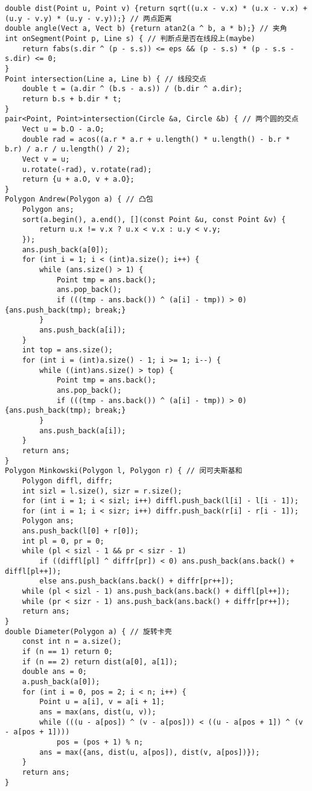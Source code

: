 \begin{verbatim}
double dist(Point u, Point v) {return sqrt((u.x - v.x) * (u.x - v.x) + (u.y - v.y) * (u.y - v.y));} // 两点距离
double angle(Vect a, Vect b) {return atan2(a ^ b, a * b);} // 夹角
int onSegment(Point p, Line s) { // 判断点是否在线段上(maybe)
    return fabs(s.dir ^ (p - s.s)) <= eps && (p - s.s) * (p - s.s - s.dir) <= 0;
}
Point intersection(Line a, Line b) { // 线段交点
    double t = (a.dir ^ (b.s - a.s)) / (b.dir ^ a.dir);
    return b.s + b.dir * t;
}
pair<Point, Point>intersection(Circle &a, Circle &b) { // 两个圆的交点
    Vect u = b.O - a.O;
    double rad = acos((a.r * a.r + u.length() * u.length() - b.r * b.r) / a.r / u.length() / 2);
    Vect v = u;
    u.rotate(-rad), v.rotate(rad);
    return {u + a.O, v + a.O};
}
Polygon Andrew(Polygon a) { // 凸包
    Polygon ans;
    sort(a.begin(), a.end(), [](const Point &u, const Point &v) {
        return u.x != v.x ? u.x < v.x : u.y < v.y;
    });
    ans.push_back(a[0]);
    for (int i = 1; i < (int)a.size(); i++) {
        while (ans.size() > 1) {
            Point tmp = ans.back();
            ans.pop_back();
            if (((tmp - ans.back()) ^ (a[i] - tmp)) > 0) {ans.push_back(tmp); break;}
        }
        ans.push_back(a[i]);
    }
    int top = ans.size();
    for (int i = (int)a.size() - 1; i >= 1; i--) {
        while ((int)ans.size() > top) {
            Point tmp = ans.back();
            ans.pop_back();
            if (((tmp - ans.back()) ^ (a[i] - tmp)) > 0) {ans.push_back(tmp); break;}
        }
        ans.push_back(a[i]);
    }
    return ans;
}
Polygon Minkowski(Polygon l, Polygon r) { // 闵可夫斯基和
    Polygon diffl, diffr;
    int sizl = l.size(), sizr = r.size();
    for (int i = 1; i < sizl; i++) diffl.push_back(l[i] - l[i - 1]);
    for (int i = 1; i < sizr; i++) diffr.push_back(r[i] - r[i - 1]);
    Polygon ans;
    ans.push_back(l[0] + r[0]);
    int pl = 0, pr = 0;
    while (pl < sizl - 1 && pr < sizr - 1)
        if ((diffl[pl] ^ diffr[pr]) < 0) ans.push_back(ans.back() + diffl[pl++]);
        else ans.push_back(ans.back() + diffr[pr++]);
    while (pl < sizl - 1) ans.push_back(ans.back() + diffl[pl++]);
    while (pr < sizr - 1) ans.push_back(ans.back() + diffr[pr++]);
    return ans;
}
double Diameter(Polygon a) { // 旋转卡壳
    const int n = a.size();
    if (n == 1) return 0;
    if (n == 2) return dist(a[0], a[1]);
    double ans = 0;
    a.push_back(a[0]);
    for (int i = 0, pos = 2; i < n; i++) {
        Point u = a[i], v = a[i + 1];
        ans = max(ans, dist(u, v));
        while (((u - a[pos]) ^ (v - a[pos])) < ((u - a[pos + 1]) ^ (v - a[pos + 1])))
            pos = (pos + 1) % n;
        ans = max({ans, dist(u, a[pos]), dist(v, a[pos])});
    }
    return ans;
}
\end{verbatim}